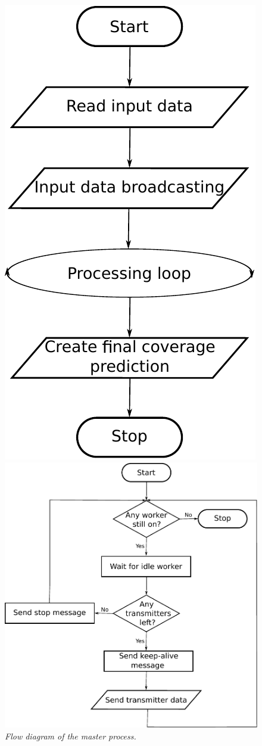 \begin{figure}
\begin{minipage}[t]{0.49\textwidth}%
\centering

\includegraphics[width=0.55\columnwidth]{04-framework_design_and_implementation/img/master_process_flow_diagram}

\caption{\textit{\emph{Flow diagram of the master process.\label{fig:04-Master_process_flow_diagram}}}}
%
\end{minipage}\hfill{}%
\begin{minipage}[t]{0.49\textwidth}%
\centering

\includegraphics[width=1\columnwidth]{04-framework_design_and_implementation/img/master_processing_loop_flow_diagram}


\end{minipage}
\end{figure}
